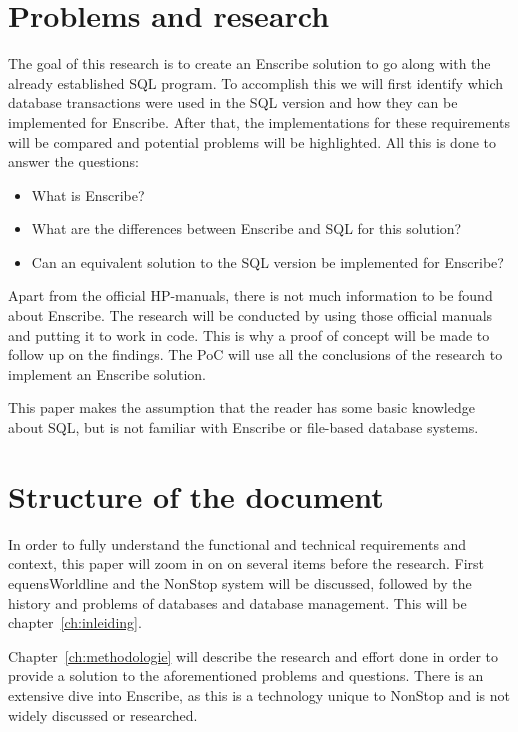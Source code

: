 \section{Problems and research}
\label{sec:onderzoeksvragen}

The goal of this research is to create an Enscribe solution to go along with the already established SQL program. To accomplish this we will first identify which
database transactions were used in the SQL version and how they can be implemented for Enscribe. After that, 
the implementations for these requirements will be compared and potential problems will be highlighted. All
this is done to answer the questions:

\begin{itemize}
	\item What is Enscribe?
	\item What are the differences between Enscribe and SQL for this solution?
	\item Can an equivalent solution to the SQL version be implemented for Enscribe?
\end{itemize}

Apart from the official HP-manuals, there is not much information to be found about Enscribe. The research will be conducted by using those official manuals and putting it to work in code. This is why a proof of concept will be made to follow up on the findings. The PoC will use all the conclusions of the research to implement
an Enscribe solution.

This paper makes the assumption that the reader has some basic knowledge about SQL, but is not familiar with Enscribe or file-based database systems.

\section{Structure of the document}
\label{sec:opzet-bachelorproef}


In order to fully understand the functional and technical requirements and context, this paper will zoom in on
on several items before the research. First equensWorldline and the NonStop system will be discussed, followed by the history and problems of databases and database management. This will be chapter~\ref{ch:inleiding}.

Chapter~\ref{ch:methodologie} will describe the research and effort done in order to provide a solution to the aforementioned problems and questions. There is an extensive dive into Enscribe, as this is a technology unique to NonStop and is not widely discussed or researched. 

